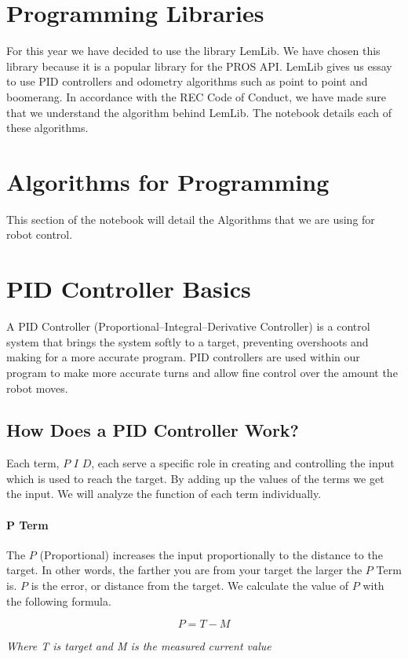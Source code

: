 \documentclass[12pt]{article}
\begin{document}
\section{Programming Libraries}
For this year we have decided to use the library LemLib. We have chosen this library because it is a popular library for the PROS API. LemLib gives us essay to use PID controllers and odometry algorithms such as point to point and boomerang. In accordance with the REC Code of Conduct, we have made sure that we understand the algorithm behind LemLib. The notebook details each of these algorithms.

\section*{Algorithms for Programming}
This section of the notebook will detail the Algorithms that we are using for robot control.
\section{PID Controller Basics}
    A PID Controller (Proportional–Integral–Derivative Controller) is a control system that brings the system softly to a target, preventing overshoots and making for a more accurate program. PID controllers are used within our program to make more accurate turns and allow fine control over the amount the robot moves.

\subsection{How Does a PID Controller Work?} \label{howPID}
    Each term, $P$ $I$ $D$, each serve a specific role in creating and controlling the input which is used to reach the target. By adding up the values of the terms we get the input. We will analyze the function of each term individually.

\paragraph{P Term}
    The $P$ (Proportional) increases the input proportionally to the distance to the target. In other words, the farther you are from your target the larger the $P$ Term is. $P$ is the error, or distance from the target. We calculate the value of $P$ with the following formula.

    $$ P = T - M$$
    \begin{center}\em{Where T is target and M is the measured current value}\end{center}
\end{document}
